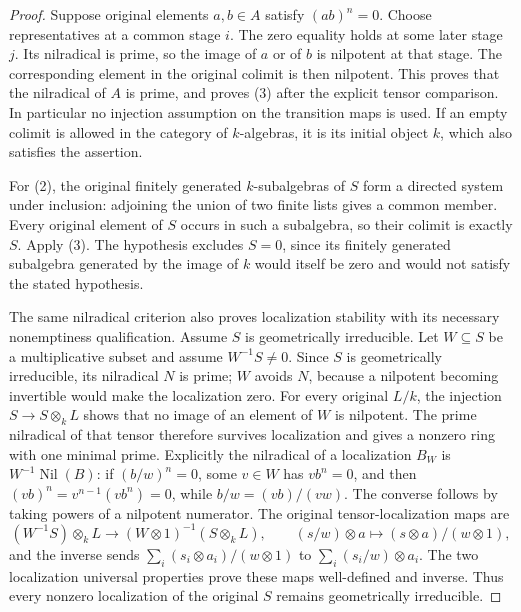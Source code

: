 \begin{proof}
Suppose original elements
$a,b\in A$ satisfy $(ab)^n=0$.
Choose representatives at a
common stage $i$. The zero
equality holds at some later
stage $j$. Its nilradical is
prime, so the image of $a$
or of $b$ is nilpotent at
that stage. The corresponding
element in the original
colimit is then nilpotent.
This proves that the nilradical
of $A$ is prime, and proves
(3) after the explicit tensor
comparison. In particular no
injection assumption on the
transition maps is used.
If an empty colimit is allowed
in the category of $k$-algebras,
it is its initial object $k$,
which also satisfies the
assertion.

For (2), the original finitely
generated $k$-subalgebras of $S$
form a directed system under
inclusion: adjoining the union
of two finite lists gives a
common member. Every original
element of $S$ occurs in such
a subalgebra, so their colimit
is exactly $S$. Apply (3).
The hypothesis excludes $S=0$,
since its finitely generated
subalgebra generated by the
image of $k$ would itself be
zero and would not satisfy
the stated hypothesis.

The same nilradical criterion
also proves localization
stability with its necessary
nonemptiness qualification.
Assume $S$ is geometrically irreducible.
Let $W\subseteq S$ be a
multiplicative subset and
assume $W^{-1}S\neq0$.
Since $S$ is geometrically
irreducible, its nilradical
$N$ is prime; $W$ avoids $N$,
because a nilpotent becoming
invertible would make the
localization zero. For every
original $L/k$, the injection
$S\to S\otimes_k L$ shows
that no image of an element
of $W$ is nilpotent. The
prime nilradical of that
tensor therefore survives
localization and gives a
nonzero ring with one minimal
prime. Explicitly the nilradical
of a localization $B_W$ is
$W^{-1}\operatorname{Nil}(B)$:
if $(b/w)^n=0$, some $v\in W$
has $v b^n=0$, and then
$(vb)^n=v^{n-1}(v b^n)=0$,
while $b/w=(vb)/(vw)$.
The converse follows by taking
powers of a nilpotent numerator.
The original tensor-localization
maps are
$$
(W^{-1}S)\otimes_k L
\longrightarrow (W\otimes1)^{-1}(S\otimes_k L),
\qquad(s/w)\otimes a\longmapsto(s\otimes a)/(w\otimes1),
$$
and the inverse sends
$\sum_i(s_i\otimes a_i)/(w\otimes1)$
to $\sum_i(s_i/w)\otimes a_i$.
The two localization universal
properties prove these maps
well-defined and inverse.
Thus every nonzero localization
of the original $S$ remains
geometrically irreducible.
\end{proof}
